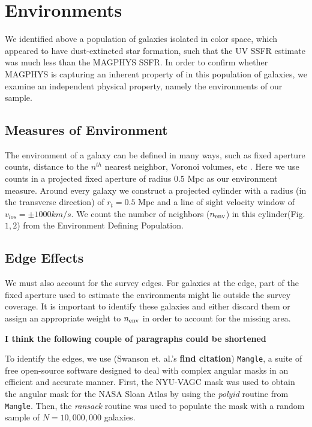 \documentclass[iop]{emulateapj}
\begin{document}
\section{Environments}

We identified above a population of galaxies isolated in color space,
which appeared to have dust-extincted star formation, such that the UV SSFR estimate
was much less than the MAGPHYS SSFR.
In order to confirm whether MAGPHYS is capturing an inherent  property of
in this population of galaxies, we examine an independent physical property, 
namely the environments of our sample.\\

\subsection{Measures of Environment}

The environment of a galaxy can be defined in many ways, such as 
fixed aperture counts, distance to the $n^{th}$ nearest neighbor, 
Voronoi volumes, etc \cite[]{Coop06}. Here we use counts in a 
projected fixed aperture of radius $0.5$ Mpc as our environment
measure. Around every galaxy we construct a projected cylinder
with a radius (in the transverse direction) of $r_{t} = 0.5$ 
Mpc and a line of sight velocity window of 
$v_{los} = \pm 1000 km/s$. We count the number of 
neighbors ($n_{\rm env}$) in this cylinder(Fig. $1,2$) from the Environment 
Defining Population.

\subsection{Edge Effects}

We must also account for the survey edges. For galaxies at the edge, 
part of the fixed aperture used to estimate the environments might 
lie outside the survey coverage. It is important to identify these
galaxies and either discard them or assign an appropriate weight to 
$n_{\rm env}$ in order to account for the missing area. 

\textbf{I think the following couple of paragraphs could be shortened}

To identify the edges, we use (Swanson et. al.'s \textbf{find citation}) 
\texttt{Mangle}, a suite of free open-source software designed 
to deal with complex angular masks in an efficient and accurate 
manner. First, the NYU-VAGC mask was used to obtain the angular 
mask for the NASA Sloan Atlas by using the \emph{polyid} 
routine from \texttt{Mangle}. Then, the \emph{ransack} 
routine was used to populate the mask with a random sample of 
$N = 10,000,000$ galaxies.
\end{document}
